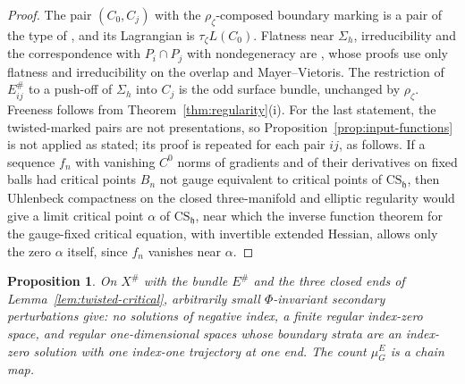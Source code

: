 \documentclass[11pt]{amsart}
\newtheorem{proposition}[theorem]{Proposition}
\theoremstyle{definition}
\theoremstyle{remark}
\theoremstyle{plain}
\numberwithin{equation}{section}
\begin{document}
\begin{proof}
The pair $(C_0,C_j)$ with the $\rho_\zeta$-composed boundary marking is a
pair of the type of \cite[Section~2.3]{DFL}, and its Lagrangian is
$\tau_\zeta L(C_0)$. Flatness near $\Sigma_h$, irreducibility and the
correspondence with $P_i\cap P_j$ with nondegeneracy are
\cite[Lemmas~2.43, 2.45, 2.47]{DFL}, whose proofs use only flatness and
irreducibility on the overlap and Mayer--Vietoris. The restriction of
$E_{ij}^\#$ to a push-off of $\Sigma_h$ into $C_j$ is the odd surface bundle,
unchanged by $\rho_\zeta$. Freeness follows from
Theorem~\ref{thm:regularity}(i). For the last statement, the twisted-marked pairs are not presentations, so
Proposition~\ref{prop:input-functions} is not applied as stated; its proof is
repeated for each pair $ij$, as follows. If a sequence
$f_n$ with vanishing $C^0$ norms of gradients and of their derivatives on
fixed balls had critical points $B_n$ not gauge equivalent to critical
points of $\mathrm{CS}_{\mathfrak h}$, then Uhlenbeck compactness on the closed three-manifold
and elliptic regularity would give a limit critical point $\alpha$ of
$\mathrm{CS}_{\mathfrak h}$, near which the inverse function theorem for the gauge-fixed
critical equation, with invertible extended Hessian, allows only the zero
$\alpha$ itself, since $f_n$ vanishes near $\alpha$.
\end{proof}

\begin{proposition}\label{prop:gauge-triangle-regular}
On $X^\#$ with the bundle $E^\#$ and the three closed ends of
Lemma~\ref{lem:twisted-critical}, arbitrarily small $\Phi$-invariant
secondary perturbations give: no solutions of negative index, a finite
regular index-zero space, and regular one-dimensional spaces whose
boundary strata are an index-zero solution with one index-one trajectory
at one end. The count $\mu_G^E$ is a chain map.
\end{proposition}
\end{document}
